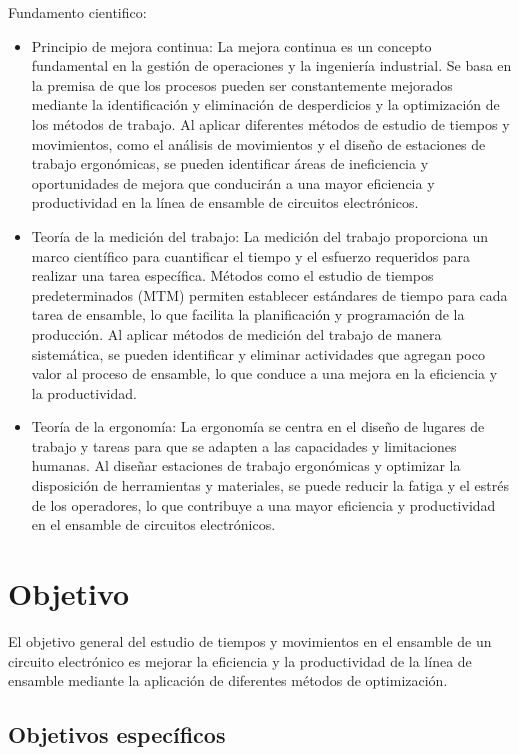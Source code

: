     Fundamento cientifico:
    \begin{itemize}
        \item Principio de mejora continua: La mejora continua es un concepto fundamental en la gestión de operaciones y la ingeniería industrial. Se basa en la premisa de que los procesos pueden ser constantemente mejorados mediante la identificación y eliminación de desperdicios y la optimización de los métodos de trabajo. Al aplicar diferentes métodos de estudio de tiempos y movimientos, como el análisis de movimientos y el diseño de estaciones de trabajo ergonómicas, se pueden identificar áreas de ineficiencia y oportunidades de mejora que conducirán a una mayor eficiencia y productividad en la línea de ensamble de circuitos electrónicos.
        \item Teoría de la medición del trabajo: La medición del trabajo proporciona un marco científico para cuantificar el tiempo y el esfuerzo requeridos para realizar una tarea específica. Métodos como el estudio de tiempos predeterminados (MTM) permiten establecer estándares de tiempo para cada tarea de ensamble, lo que facilita la planificación y programación de la producción. Al aplicar métodos de medición del trabajo de manera sistemática, se pueden identificar y eliminar actividades que agregan poco valor al proceso de ensamble, lo que conduce a una mejora en la eficiencia y la productividad.
        \item Teoría de la ergonomía: La ergonomía se centra en el diseño de lugares de trabajo y tareas para que se adapten a las capacidades y limitaciones humanas. Al diseñar estaciones de trabajo ergonómicas y optimizar la disposición de herramientas y materiales, se puede reducir la fatiga y el estrés de los operadores, lo que contribuye a una mayor eficiencia y productividad en el ensamble de circuitos electrónicos.
    \end{itemize}
    \section{Objetivo}
    
    El objetivo general del estudio de tiempos y movimientos en el ensamble de un circuito electrónico es mejorar la eficiencia y la productividad de la línea de ensamble mediante la aplicación de diferentes métodos de optimización.
    
    \subsection{Objetivos específicos }
    
